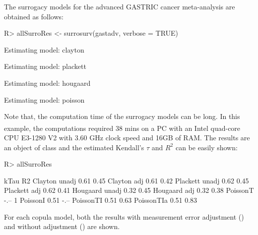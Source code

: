 \documentclass[article,shortnames, nojss]{jss}\usepackage[]{graphicx}\usepackage[]{color}
\begin{document}
  
  The surrogacy models for the advanced GASTRIC cancer meta-analysis
  are obtained as follows:
\begin{Schunk}
\begin{Sinput}
R> allSurroRes <-  surrosurv(gastadv, verbose = TRUE)
\end{Sinput}
\begin{Soutput}
Estimating model: clayton
\end{Soutput}
\begin{Soutput}
Estimating model: plackett
\end{Soutput}
\begin{Soutput}
Estimating model: hougaard
\end{Soutput}
\begin{Soutput}
Estimating model: poisson
\end{Soutput}
\end{Schunk}
Note that, the computation time of the surrogacy models can be long.
In this example, the computations required
  38
  mins
  on a PC with an Intel\textsuperscript{\textregistered} quad-core CPU E3-1280 V2
  with 3.60 GHz clock speed and 16GB of RAM.
The results are an object of class 
  and the estimated Kendall's $\tau$ and $R^2$ can be easily shown:
\begin{Schunk}
\begin{Sinput}
R>   allSurroRes
\end{Sinput}
\begin{Soutput}
               kTau R2  
Clayton unadj  0.61 0.45
Clayton adj    0.61 0.42
Plackett unadj 0.62 0.45
Plackett adj   0.62 0.41
Hougaard unadj 0.32 0.45
Hougaard adj   0.32 0.38
PoissonT       -.-- 1   
PoissonI       0.51 -.--
PoissonTI      0.51 0.63
PoissonTIa     0.51 0.83
\end{Soutput}
\end{Schunk}
For each copula model,
  both the results with measurement error adjustment ()
  and without adjustment () are shown.
\end{document}

